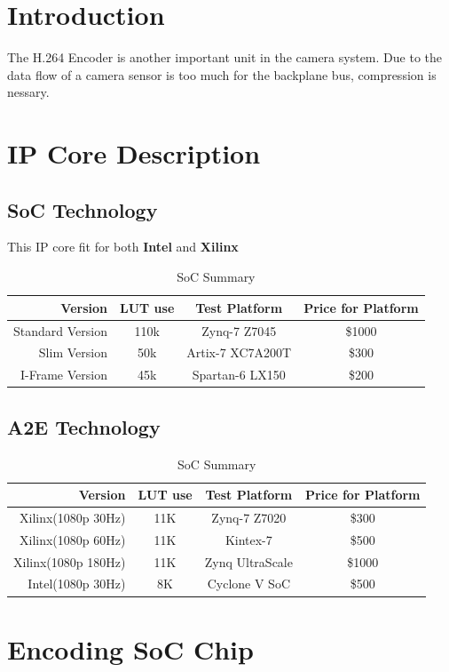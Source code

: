 \documentclass[12pt,article]{memoir}
\begin{document}
\section{Introduction}
The H.264 Encoder is another important unit in the camera system. Due to the data flow of a camera sensor is too much for the backplane bus, compression is nessary.
\section{IP Core Description}
\subsection{SoC Technology}
This IP core fit for both \textbf{Intel} and \textbf{Xilinx}
\begin{table}[H]
	\centering
		\begin{tabu}{r || c | c | c }
		Version & LUT use & Test Platform & Price for Platform\\ \hline
		Standard Version & 110k & Zynq-7 Z7045 & \$1000\\
		Slim Version & 50k & Artix-7 XC7A200T & \$300\\
		I-Frame Version & 45k & Spartan-6 LX150 & \$200\\
		\end{tabu}
	\caption{SoC Summary}
	\label{tab:socs}
\end{table}
\subsection{A2E Technology}
\begin{table}[H]
	\centering
		\begin{tabu}{r || c | c | c }
		Version & LUT use & Test Platform & Price for Platform\\ \hline
		Xilinx(1080p 30Hz) & 11K & Zynq-7 Z7020 & \$300\\
		Xilinx(1080p 60Hz) & 11K & Kintex-7 & \$500\\
		Xilinx(1080p 180Hz) & 11K & Zynq UltraScale & \$1000\\\hline
		Intel(1080p 30Hz) & 8K & Cyclone V SoC & \$500\\
		\end{tabu}
	\caption{SoC Summary}
	\label{tab:socs}
\end{table}
\newpage
\section{Encoding SoC Chip}
\end{document}
